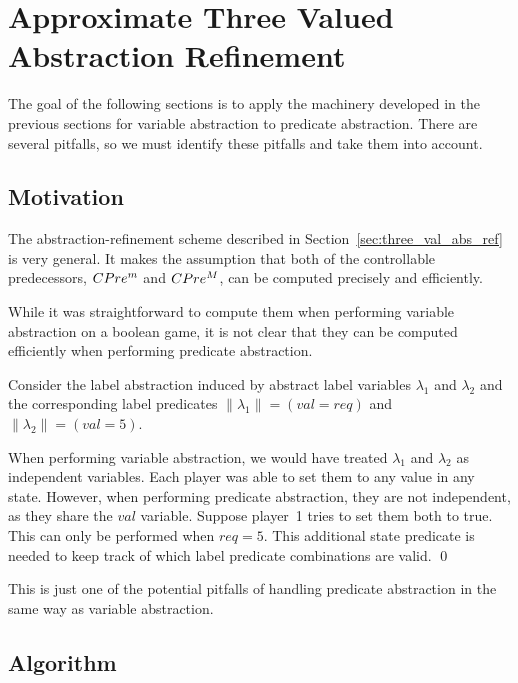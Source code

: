 \section{Approximate Three Valued Abstraction Refinement}

The goal of the following sections is to apply the machinery developed in the previous sections for variable abstraction to predicate abstraction. There are several pitfalls, so we must identify these pitfalls and take them into account.

\subsection{Motivation}
The abstraction-refinement scheme described in Section~\ref{sec:three_val_abs_ref} is very general. It makes the assumption that both of the controllable predecessors, $CPre^m$ and $CPre^M$, can be computed precisely and efficiently.

While it was straightforward to compute them when performing variable abstraction on a boolean game, it is not clear that they can be computed efficiently when performing predicate abstraction.

\begin{ex}
    \everymath{\mathtt{\xdef\tmp{\fam\the\fam\relax}\aftergroup\tmp}}
    \everydisplay{\mathtt{\xdef\tmp{\fam\the\fam\relax}\aftergroup\tmp}}
    Consider the label abstraction induced by abstract label variables $\lambda_1$ and $\lambda_2$ and the corresponding label predicates $\|\lambda_1\| = (val=req)$ and $\|\lambda_2\| = (val=5)$.

    When performing variable abstraction, we would have treated $\lambda_1$ and $\lambda_2$ as independent variables. Each player was able to set them to any value in any state. However, when performing predicate abstraction, they are not independent, as they share the $val$ variable. Suppose player~1 tries to set them both to true. This can only be performed when $req=5$. This additional state predicate is needed to keep track of which label predicate combinations are valid.
    \qed
\end{ex}

This is just one of the potential pitfalls of handling predicate abstraction in the same way as variable abstraction. 

\subsection{Algorithm}

